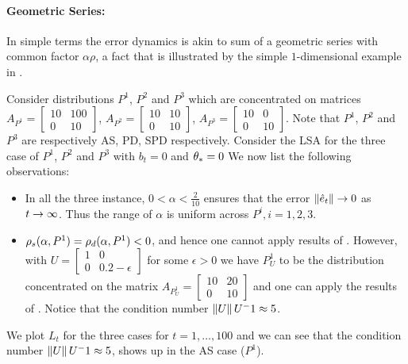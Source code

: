 \begin{itemize}[leftmargin=*, before = \leavevmode\vspace{-\baselineskip}]
\paragraph{Geometric Series:} In simple terms the error dynamics is akin to sum of a geometric series with common factor $\alpha\rho$, a fact that is illustrated by the simple $1$-dimensional example in .
\begin{example}
Consider distributions $P^1$, $P^2$ and $P^3$ which are concentrated on matrices $A_{P^1}=\begin{bmatrix} 10 &100\\ 0 &10\end{bmatrix}$, $A_{P^2}=\begin{bmatrix} 10 &10\\ 0 &10\end{bmatrix}$, $A_{P^3}=\begin{bmatrix} 10 &0 \\ 0 &10\end{bmatrix}$. Note that $P^1$, $P^2$ and $P^3$ are respectively AS, PD, SPD respectively. Consider the LSA for the three case of $P^1$, $P^2$ and $P^3$ with $b_t=0$ and $\theta_*=0$
We now list the following observations:
\begin{itemize}%
\item In all the three instance, $0<\alpha<\frac2{10}$ ensures that the error $\left\| \hat{e}_t\right\|\rightarrow 0$ as $t\rightarrow\infty$. Thus the range of $\alpha$ is uniform across $P^i,i=1,2,3$.
\item $\rho_s(\alpha,P^1)=\rho_d(\alpha,P^1)<0$, and hence one cannot apply results of . However, with  $U=\begin{bmatrix}1 &0 \\ 0 &0.2-\epsilon\end{bmatrix}$ for some $\epsilon>0$ we have $P^1_U$ to be the distribution concentrated on the matrix $A_{P^1_U}=\begin{bmatrix} 10 &20 \\ 0 &10\end{bmatrix}$ and one can apply the results of . Notice that the condition number $\left\| U\right\|{U^-1}\approx 5$.
\end{itemize}
We plot $L_t$ for the three cases for $t=1,\ldots,100$ and we can see that the condition number $\left\| U\right\|{U^-1}\approx 5$, shows up in the AS case ($P^1$).
\end{example}
\end{itemize}
